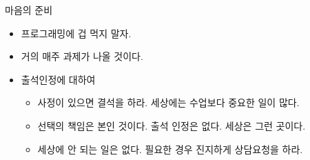 \documentclass{beamer}
\begin{document}
\begin{frame}{마음의 준비}

\begin{itemize}
\item 프로그래밍에 겁 먹지 말자.
\item 거의 매주 과제가 나올 것이다.
\item 출석인정에 대하여
	\begin{itemize}
		\item 사정이 있으면 결석을 하라. 세상에는 수업보다 중요한 일이 많다.
		\item 선택의 책임은 본인 것이다. 출석 인정은 없다. 세상은 그런 곳이다.
		\item 세상에 안 되는 일은 없다. 필요한 경우 진지하게 상담요청을 하라.
	\end{itemize}
\end{itemize}

\end{frame}
\end{document}
